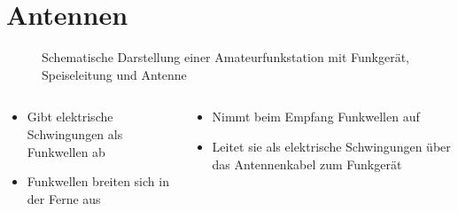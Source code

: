 
\section{Antennen}
\label{section:antennen}
\begin{frame}%

\begin{figure}
    \caption{\scriptsize Schematische Darstellung einer Amateurfunkstation mit Funkgerät, Speiseleitung und Antenne}
    \label{n_trx_kabel_und_antenne}
\end{figure}
\begin{columns}
    \begin{column}{0.48\textwidth}
    \begin{itemize}
  \item Gibt elektrische Schwingungen als Funkwellen ab
  \item Funkwellen breiten sich in der Ferne aus
  \end{itemize}

    \end{column}
   \begin{column}{0.48\textwidth}
       \begin{itemize}
  \item Nimmt beim Empfang Funkwellen auf
  \item Leitet sie als elektrische Schwingungen über das Antennenkabel zum Funkgerät
  \end{itemize}

   \end{column}
\end{columns}

\end{frame}

\begin{frame}
\end{frame}%
